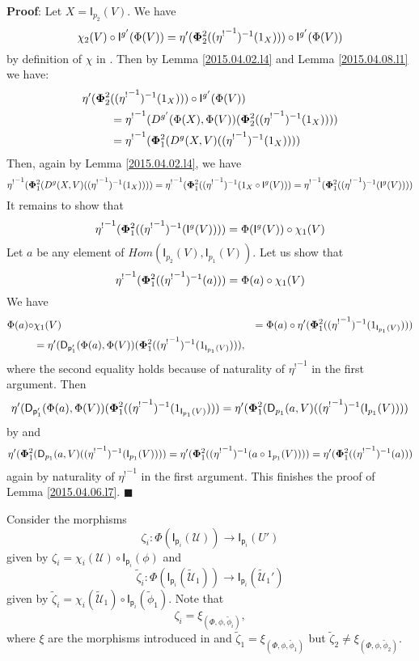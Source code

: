 \documentclass[12pt]{article}
\numberwithin{equation}{section}
\newenvironment{myproof}{{\bf Proof}:}{$\blacksquare$ \vskip 5mm }
\newcommand{\sr}{\rightarrow}
\newcommand{\wt}{\widetilde}
\newcommand{\id}{1}            %
\newcommand{\p}{\mathsf{p}}
\newcommand{\U}{\mathcal{U}}
\newcommand{\D}{\mathsf{D}}
\newcommand{\I}{\mathsf{I}}
\newcommand{\etashriek}{\eta^!}
\newcommand{\etaunshriek}{{\etashriek}^{-1}}
\begin{document}
\begin{myproof}
Let $X=\I_{p_2}(V)$. We have
%
$$\chi_2(V)\circ {\I^{g'}(\Phi(V))}=\eta'({\bf\Phi}_2^2((\etaunshriek)^{-1}(\id_{X})))\circ
\I^{g'}(\Phi(V))$$
%
by definition of $\chi$ in \cite[Construction 5.6]{fromunivwithPi}. Then by
Lemma \ref{2015.04.02.l4} and Lemma \ref{2015.04.08.l1} we have:
%
\begin{align*}
  \eta'({\bf\Phi}_2^2&((\etaunshriek)^{-1}(\id_{X})))\circ \I^{g'}(\Phi(V)) \\
    & = \etaunshriek(D^{g'}(\Phi(X),\Phi(V))({\bf\Phi}_2^2((\etaunshriek)^{-1}(\id_X)))) \\
    & = \etaunshriek({\bf\Phi}_1^2(D^g(X,V)((\etaunshriek)^{-1}(\id_X))))
\end{align*}
%
Then, again by Lemma \ref{2015.04.02.l4}, we have
%
$$\etaunshriek({\bf\Phi}_1^2(D^g(X,V)((\etaunshriek)^{-1}(\id_X))))=\etaunshriek({\bf\Phi}_1^2((\etaunshriek)^{-1}(\id_X\circ
\I^g(V)))=\etaunshriek({\bf\Phi}_1^2((\etaunshriek)^{-1}(\I^g(V))))$$
%
It remains to show that
%
$$\etaunshriek({\bf\Phi}_1^2((\etaunshriek)^{-1}(\I^g(V))))=\Phi(\I^g(V))\circ \chi_1(V)$$
%
Let $a$ be any element of $Hom(\I_{p_2}(V),\I_{p_1}(V))$. Let us show that
%
$$\etaunshriek({\bf\Phi}_1^2((\etaunshriek)^{-1}(a)))=\Phi(a)\circ \chi_1(V)$$
%
We have
%
\begin{align*}
  \Phi(a)\circ & \chi_1(V)
    & = \Phi(a)\circ \eta'({\bf\Phi}^2_1((\etaunshriek)^{-1}(\id_{\I_{p_1}(V)}))) \\
    & = \eta'(\D_{\p_1'}(\Phi(a),\Phi(V))({\bf\Phi}^2_1((\etaunshriek)^{-1}(\id_{\I_{p_1}(V)}))),
\end{align*}
%
where the second equality holds because of naturality of $\etaunshriek$ in the first
argument. Then
%
$$\eta'(\D_{\p_1'}(\Phi(a),\Phi(V))({\bf\Phi}^2_1((\etaunshriek)^{-1}(\id_{\I_{p_1}(V)})))=\eta'({\bf\Phi}^2_1(\D_{p_1}(a,V)((\etaunshriek)^{-1}(\I_{p_1}(V))))$$
%
by \cite[Lemma 5.4]{fromunivwithPi} and
%
$$\eta'({\bf\Phi}^2_1(\D_{p_1}(a,V)((\etaunshriek)^{-1}(\I_{p_1}(V))))=\eta'({\bf\Phi}^2_1((\etaunshriek)^{-1}(a\circ
\id_{p_1}(V))))=\eta'({\bf\Phi}_1^2((\etaunshriek)^{-1}(a)))$$
%
again by naturality of $\etaunshriek$ in the first argument. This finishes the proof of
Lemma \ref{2015.04.06.l7}.
\end{myproof}




Consider the morphisms
%
$$\zeta_i:\Phi(\I_{\p_i}(\U))\sr \I_{\p_i}(U')$$
%
given by $\zeta_i=\chi_i(\U)\circ \I_{\p_i}(\phi)$ and
%
$$\wt{\zeta}_i:\Phi(\I_{\p_i}(\wt{\U}_1))\sr \I_{\p_i}(\wt{\U}_1')$$
%
given by $\wt{\zeta}_i=\chi_i(\wt{\U}_1)\circ \I_{\p_i}(\wt{\phi}_1)$. Note that
%
$$\zeta_i=\xi_{(\Phi,\phi,\wt{\phi}_i)},$$
%
where $\xi$ are the morphisms introduced in \cite{fromunivwithPi} and
$\wt{\zeta}_1=\xi_{(\Phi,\phi,\wt{\phi}_1)}$ but $\wt{\zeta}_2\ne
\xi_{(\Phi,\phi,\wt{\phi}_2)}$.
\end{document}
